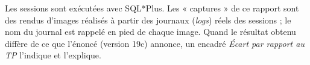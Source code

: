 \documentclass[11pt,a4paper]{article}
\begin{document}
Les sessions sont exécutées avec SQL*Plus. Les « captures » de ce rapport sont des rendus d'images
réalisés à partir des journaux (\emph{logs}) réels des sessions ; le nom du journal est rappelé en pied
de chaque image. Quand le résultat obtenu diffère de ce que l'énoncé (version 19c) annonce, un encadré
\emph{Écart par rapport au TP} l'indique et l'explique.

\newpage

\end{document}
